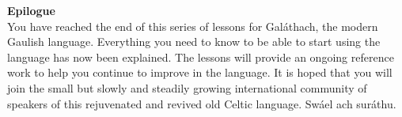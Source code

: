 \begin{center}
\textbf{Epilogue}\\
\bigskip
You have reached the end of this series of lessons for Gal\'{a}thach, the modern Gaulish language. Everything you need to know to be able to start using the language has now been explained. The lessons will provide an ongoing reference work to help you continue to improve in the language. It is hoped that you will join the small but slowly and steadily growing international community of speakers of this rejuvenated and revived old Celtic language.
\bigskip
Sw\'{a}el ach sur\'{a}thu.
\end{center}
